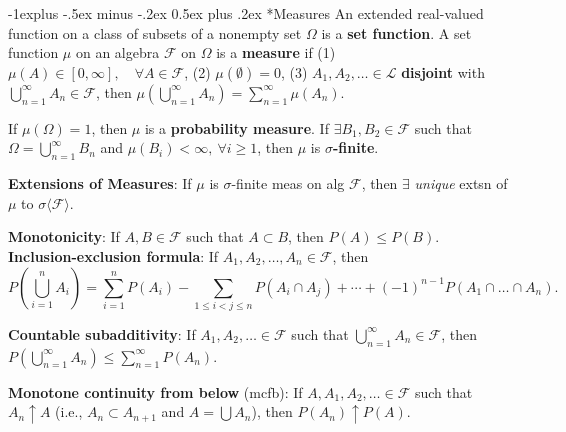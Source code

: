 \documentclass[paper=letter,fontsize=2.89mm]{scrartcl}
\makeatletter
\renewcommand{\subsection}{\@startsection{subsection}{2}{0mm}%
                                {-1explus -.5ex minus -.2ex}%
                                {0.5ex plus .2ex}%
                                {\normalfont\normalsize\bfseries}}
\makeatother
\begin{document}
\raggedright
\scriptsize
\begin{multicols*}{3}


\setlength{\premulticols}{.05pt}
\setlength{\postmulticols}{.05pt}
\setlength{\multicolsep}{.05pt}
\setlength{\columnsep}{.05pt}

\subsection*{Measures}
An extended real-valued function on a class of subsets of a nonempty set $\Omega$ is a \textbf{set function}. 
A set function $\mu$ on an algebra $\mathcal{F}$ on $\Omega$ is a \textbf{measure} if
(1) $\mu(A) \in [0,\infty], \quad \forall A \in \mathcal{F}$,
(2) $\mu(\emptyset) = 0$, 
(3) $A_1, A_2, \dots \in \mathcal{L}$ \textbf{disjoint} with  $\bigcup_{n=1}^\infty A_n \in \mathcal{F}$, then
$\mu\left(\bigcup_{n=1}^\infty A_n\right) = \sum_{n=1}^\infty \mu(A_n)$. \\ \medskip

If $\mu(\Omega) = 1$, then $\mu$ is a \textbf{probability measure}. If $\exists B_1, B_2 \in \mathcal{F}$ such that $\Omega = \bigcup_{n=1}^\infty B_n$ and $\mu(B_i) < \infty, ~\forall i \ge 1$, then $\mu$ is \textbf{$\sigma$-finite}. \\\medskip

\textbf{Extensions of Measures}: If $\mu$ is $\sigma$-finite meas on alg $\mathcal{F}$, then $\exists$ \emph{unique} extsn of $\mu$ to $\sigma\langle \mathcal{F}\rangle$. \\\medskip

\textbf{Monotonicity}: If $A, B \in \mathcal{F}$ such that $A \subset B$, then $P(A) \le P(B)$. \\\medskip
\textbf{Inclusion-exclusion formula}: If $A_1,A_2,\dots,A_n \in \mathcal{F}$, then
$$P\left( \bigcup_{i=1}^n A_i\right) = \sum_{i=1}^n P(A_i) - \sum_{1\le i < j \le n} P(A_i \cap A_j) + \cdots + (-1)^{n-1}P(A_1 \cap \dots \cap A_n).$$

\textbf{Countable subadditivity}: If $A_1,A_2,\dots \in \mathcal{F}$ such that $\bigcup_{n=1}^\infty A_n \in \mathcal{F}$, then $P\left( \bigcup_{n=1}^\infty A_n\right) \le \sum_{n=1}^\infty P(A_n)$. \\ \medskip

\textbf{Monotone continuity from below} (mcfb): If $A, A_1, A_2, \dots \in \mathcal{F}$ such that $A_n \uparrow A$ (i.e., $A_n \subset A_{n+1}$ and $A = \bigcup A_n$), then $P(A_n) \uparrow P(A)$. \\\medskip


\end{multicols*}
\end{document}
